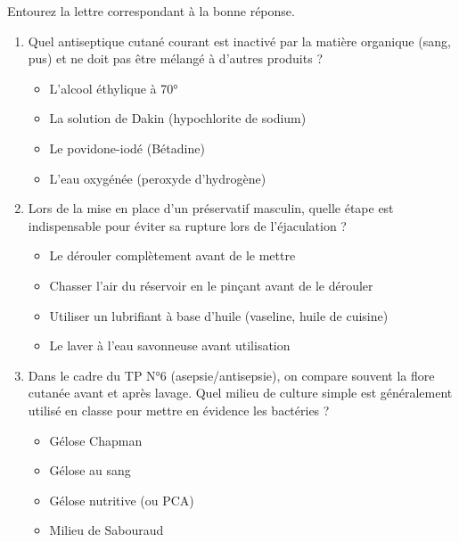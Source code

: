 \documentclass[11pt]{article}
\begin{document}
\begin{exercice}
Entourez la lettre correspondant à la bonne réponse.
\begin{enumerate}
    \item Quel antiseptique cutané courant est inactivé par la matière organique (sang, pus) et ne doit pas être mélangé à d'autres produits ?
    \begin{itemize}
        \item[A] L'alcool éthylique à 70°
        \item[B] La solution de Dakin (hypochlorite de sodium)
        \item[C] Le povidone-iodé (Bétadine\texteuro{})
        \item[D] L'eau oxygénée (peroxyde d'hydrogène)
    \end{itemize}
    \item Lors de la mise en place d'un préservatif masculin, quelle étape est indispensable pour éviter sa rupture lors de l'éjaculation ?
    \begin{itemize}
        \item[A] Le dérouler complètement avant de le mettre
        \item[B] Chasser l'air du réservoir en le pinçant avant de le dérouler
        \item[C] Utiliser un lubrifiant à base d'huile (vaseline, huile de cuisine)
        \item[D] Le laver à l'eau savonneuse avant utilisation
    \end{itemize}
    \item Dans le cadre du TP N°6 (asepsie/antisepsie), on compare souvent la flore cutanée avant et après lavage. Quel milieu de culture simple est généralement utilisé en classe pour mettre en évidence les bactéries ?
    \begin{itemize}
        \item[A] Gélose Chapman
        \item[B] Gélose au sang
        \item[C] Gélose nutritive (ou PCA)
        \item[D] Milieu de Sabouraud
    \end{itemize}
\end{enumerate}
\end{exercice}
\end{document}
